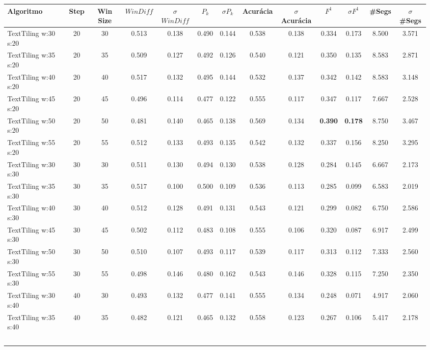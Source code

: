 \documentclass{article}
\begin{document}
 

\tiny\begin{longtable}[c]{|l|c|c|c|c|c|c|c|c|c|c|c|c|} 
\hline 
Algoritmo & Step & Win Size & $WinDiff$ & $\sigma$$WinDiff$ & $P_k$ & $\sigma$$P_k$ & Acurácia & $\sigma$Acurácia & $F^1$ & $\sigma$$F^1$ & \#Segs & $\sigma$\#Segs\\ \hline 
TextTiling w:30 s:20 & 20 & 30 & 0.513 & 0.138 & 0.490 & 0.144 & 0.538 & 0.138 & 0.334 & 0.173 & 8.500 & 3.571  \\ \hline 
 TextTiling w:35 s:20 & 20 & 35 & 0.509 & 0.127 & 0.492 & 0.126 & 0.540 & 0.121 & 0.350 & 0.135 & 8.583 & 2.871  \\ \hline 
 TextTiling w:40 s:20 & 20 & 40 & 0.517 & 0.132 & 0.495 & 0.144 & 0.532 & 0.137 & 0.342 & 0.142 & 8.583 & 3.148  \\ \hline 
 TextTiling w:45 s:20 & 20 & 45 & 0.496 & 0.114 & 0.477 & 0.122 & 0.555 & 0.117 & 0.347 & 0.117 & 7.667 & 2.528  \\ \hline 
 TextTiling w:50 s:20 & 20 & 50 & 0.481 & 0.140 & 0.465 & 0.138 & 0.569 & 0.134 & \cellcolor{gray!20} \textbf{0.390} & \cellcolor{gray!20} \textbf{0.178} & 8.750 & 3.467  \\ \hline 
 TextTiling w:55 s:20 & 20 & 55 & 0.512 & 0.133 & 0.493 & 0.135 & 0.542 & 0.132 & 0.337 & 0.156 & 8.250 & 3.295  \\ \hline 
 TextTiling w:30 s:30 & 30 & 30 & 0.511 & 0.130 & 0.494 & 0.130 & 0.538 & 0.128 & 0.284 & 0.145 & 6.667 & 2.173  \\ \hline 
 TextTiling w:35 s:30 & 30 & 35 & 0.517 & 0.100 & 0.500 & 0.109 & 0.536 & 0.113 & 0.285 & 0.099 & 6.583 & 2.019  \\ \hline 
 TextTiling w:40 s:30 & 30 & 40 & 0.512 & 0.128 & 0.491 & 0.131 & 0.543 & 0.121 & 0.299 & 0.082 & 6.750 & 2.586  \\ \hline 
 TextTiling w:45 s:30 & 30 & 45 & 0.502 & 0.112 & 0.483 & 0.108 & 0.555 & 0.106 & 0.320 & 0.087 & 6.917 & 2.499  \\ \hline 
 TextTiling w:50 s:30 & 30 & 50 & 0.510 & 0.107 & 0.493 & 0.117 & 0.539 & 0.117 & 0.313 & 0.112 & 7.333 & 2.560  \\ \hline 
 TextTiling w:55 s:30 & 30 & 55 & 0.498 & 0.146 & 0.480 & 0.162 & 0.543 & 0.146 & 0.328 & 0.115 & 7.250 & 2.350  \\ \hline 
 TextTiling w:30 s:40 & 40 & 30 & 0.493 & 0.132 & 0.477 & 0.141 & 0.555 & 0.134 & 0.248 & 0.071 & 4.917 & 2.060  \\ \hline 
 TextTiling w:35 s:40 & 40 & 35 & 0.482 & 0.121 & 0.465 & 0.132 & 0.558 & 0.123 & 0.267 & 0.106 & 5.417 & 2.178  \\ \hline 
$$
\end{longtable}
\end{document}
